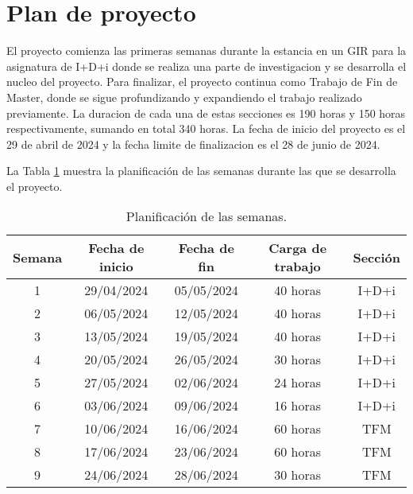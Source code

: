 \section{Plan de proyecto}

El proyecto comienza las primeras semanas durante la estancia en un GIR para la asignatura de I+D+i donde se realiza una parte de investigacion y se desarrolla el nucleo del proyecto. Para finalizar, el proyecto continua como Trabajo de Fin de Master, donde se sigue profundizando y expandiendo el trabajo realizado previamente. La duracion de cada una de estas secciones es 190 horas y 150 horas respectivamente, sumando en total 340 horas. La fecha de inicio del proyecto es el 29 de abril de 2024 y la fecha limite de finalizacion es el 28 de junio de 2024.


La Tabla \ref{table:planificacion} muestra la planificación de las semanas durante las que se desarrolla el proyecto.

\begin{table}[]
  \centering
  \begin{tabular}{|c|c|c|c|c|}
  \hline
  { \textbf{Semana}} & { \textbf{Fecha de inicio}} & { \textbf{Fecha de fin}} & { \textbf{Carga de trabajo}}& { \textbf{Sección}} \\ \hline
  1 & 29/04/2024 & 05/05/2024 & 40 horas  & I+D+i                                              \\ \hline
  2 & 06/05/2024 & 12/05/2024 & 40 horas   & I+D+i                                         \\ \hline
  3 & 13/05/2024 & 19/05/2024 & 40 horas   & I+D+i                                             \\ \hline
  4 & 20/05/2024 & 26/05/2024 & 30 horas   & I+D+i                                              \\ \hline
  5 & 27/05/2024 & 02/06/2024 & 24 horas   & I+D+i                                         \\ \hline
  6 & 03/06/2024 & 09/06/2024 & 16 horas    & I+D+i                                               \\ \hline
  7 & 10/06/2024 & 16/06/2024 & 60 horas    & TFM                                             \\ \hline
  8 & 17/06/2024 & 23/06/2024 & 60 horas    & TFM                                           \\ \hline
  9 & 24/06/2024 & 28/06/2024 & 30 horas   & TFM                                            \\ \hline
  \end{tabular}
  \caption{Planificación de las semanas.}
\label{table:planificacion}
  \end{table}

